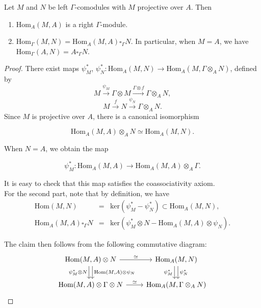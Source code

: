 \begin{lemma}Let $ M$ and $ N$ be left $ \Gamma$-comodules with $ M$ projective over $ A$.  Then
\begin{enumerate}
\item $ \text{Hom}_A(M,A)$ is a right $ \Gamma$-module.
\item $ \text{Hom}_{\Gamma} (M, N) = \text{Hom}_A (M, A) \square_{\Gamma}N$.  In particular, when $ M = A$, we have $ \text{Hom}_{\Gamma}(A, N) = A \square_{\Gamma}N$.
\end{enumerate}
\end{lemma}
\begin{proof} There exist maps $ \psi_M^*$, $ \psi_N^*: \text{Hom}_A(M, N) \to \text{Hom}_A(M, \Gamma \otimes_A N)$, defined by
$$M \stackrel{\psi_M}{\longrightarrow} \Gamma \otimes M \stackrel{\Gamma \otimes f}{\longrightarrow} \Gamma \otimes_A N,$$
$$ M \stackrel{f}{\longrightarrow} N \stackrel{\psi_N}{\longrightarrow} \Gamma \otimes_A N.$$
Since $ M$ is projective over $ A$, there is a canonical isomorphism

$$\text{Hom}_A (M, A) \otimes_A N \simeq \text{Hom}_A(M, N).$$

When $ N = A$, we obtain the map

$$ \psi_M^*: \text{Hom}_A (M, A) \longrightarrow \text{Hom}_A(M, A) \otimes_A \Gamma.$$

It is easy to check that this map satisfies the coassociativity axiom. \\

For the second part, note that by definition, we have
$$\begin{array}{rll}
\text{Hom}(M, N) &=& \text{ker}(\psi_M^* - \psi_N^*) \subset \text{Hom}_A(M, N),\\
\text{Hom}_A(M, A) \square_{\Gamma} N &=& \text{ker}(\psi_M^* \otimes N - \text{Hom}_A(M, A) \otimes \psi_N).
\end{array}$$

The claim then follows from the following commutative diagram:
$$\begin{tikzcd}
\text{Hom}(M, A) \otimes N \ar[r, "\simeq"] \ar[d, shift left, "\text{Hom}(M \text{,} A) \otimes \psi_N"] \ar[d, shift right, swap, "\psi^*_M \otimes N"] & \text{Hom}_A(M, N) \ar[d, shift left, "\psi_N^*"] \ar[d, shift right, swap, "\psi_M^*"] \\
\text{Hom}(M, A) \otimes \Gamma \otimes N  \ar[r, "\simeq"] & \text{Hom}_A(M, \Gamma \otimes_A N)
\end{tikzcd}$$

\end{proof}

